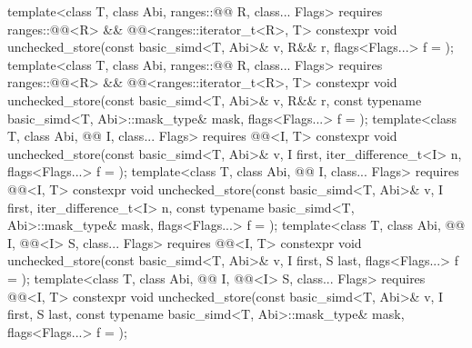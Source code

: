 \begin{codeblock}
{  template<class T, class Abi, ranges::@@ R, class... Flags>
    requires ranges::@@<R> && @@<ranges::iterator_t<R>, T>
    constexpr void unchecked_store(const basic_simd<T, Abi>& v, R&& r,
                                   flags<Flags...> f = {});
  template<class T, class Abi, ranges::@@ R, class... Flags>
    requires ranges::@@<R> && @@<ranges::iterator_t<R>, T>
    constexpr void unchecked_store(const basic_simd<T, Abi>& v, R&& r,
      const typename basic_simd<T, Abi>::mask_type& mask, flags<Flags...> f = {});
  template<class T, class Abi, @@ I, class... Flags>
    requires @@<I, T>
    constexpr void unchecked_store(const basic_simd<T, Abi>& v, I first,
                                   iter_difference_t<I> n, flags<Flags...> f = {});
  template<class T, class Abi, @@ I, class... Flags>
    requires @@<I, T>
    constexpr void unchecked_store(const basic_simd<T, Abi>& v, I first,
      iter_difference_t<I> n, const typename basic_simd<T, Abi>::mask_type& mask,
      flags<Flags...> f = {});
  template<class T, class Abi, @@ I, @@<I> S, class... Flags>
    requires @@<I, T>
    constexpr void unchecked_store(const basic_simd<T, Abi>& v, I first, S last,
                                   flags<Flags...> f = {});
  template<class T, class Abi, @@ I, @@<I> S, class... Flags>
    requires @@<I, T>
    constexpr void unchecked_store(const basic_simd<T, Abi>& v, I first, S last,
      const typename basic_simd<T, Abi>::mask_type& mask, flags<Flags...> f = {});

}
\end{codeblock}
